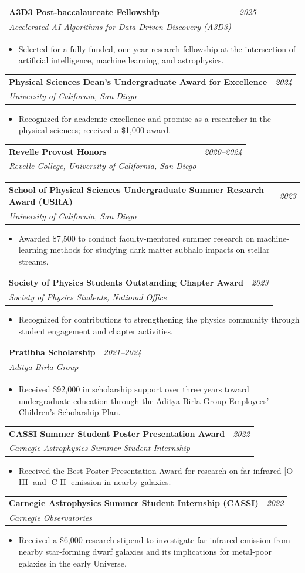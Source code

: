 \documentclass[a4paper,11pt]{article}
\makeatletter
\newcommand{\resumeProject}[4]{
\vspace{0.5mm}\item
    \begin{tabular*}{0.98\textwidth}[t]{l@{\extracolsep{\fill}}r}
        \textbf{#1} & \textit{\footnotesize{#3}} \\
        \footnotesize{\textit{#2}} & \footnotesize{#4}
    \end{tabular*}
    \vspace{-2.4mm}
}
\newcommand{\resumeItemListStart}{\begin{itemize}[leftmargin=*,labelsep=1mm,itemsep=0.5mm]}
\newcommand{\resumeItemListEnd}{\end{itemize}\vspace{-2mm}}
\makeatother
\begin{document}
\resumeProject
  {A3D3 Post-baccalaureate Fellowship}
  {Accelerated AI Algorithms for Data-Driven Discovery (A3D3)}
  {2025}
  {}
\resumeItemListStart
  \item Selected for a fully funded, one-year research fellowship at the intersection of artificial intelligence, machine learning, and astrophysics.
\resumeItemListEnd

\resumeProject
  {Physical Sciences Dean's Undergraduate Award for Excellence}
  {University of California, San Diego}
  {2024}
  {}
\resumeItemListStart
  \item Recognized for academic excellence and promise as a researcher in the physical sciences; received a \$1,000 award.
\resumeItemListEnd

\resumeProject
  {Revelle Provost Honors}
  {Revelle College, University of California, San Diego}
  {2020--2024}
  {}

\resumeProject
  {School of Physical Sciences Undergraduate Summer Research Award (USRA)}
  {University of California, San Diego}
  {2023}
  {}
\resumeItemListStart
  \item Awarded \$7,500 to conduct faculty-mentored summer research on machine-learning methods for studying dark matter subhalo impacts on stellar streams.
\resumeItemListEnd

\resumeProject
  {Society of Physics Students Outstanding Chapter Award}
  {Society of Physics Students, National Office}
  {2023}
  {}
\resumeItemListStart
  \item Recognized for contributions to strengthening the physics community through student engagement and chapter activities.
\resumeItemListEnd

\resumeProject
  {Pratibha Scholarship}
  {Aditya Birla Group}
  {2021--2024}
  {}
\resumeItemListStart
  \item Received \$92,000 in scholarship support over three years toward undergraduate education through the Aditya Birla Group Employees' Children’s Scholarship Plan.
\resumeItemListEnd

\resumeProject
  {CASSI Summer Student Poster Presentation Award}
  {Carnegie Astrophysics Summer Student Internship}
  {2022}
  {}
\resumeItemListStart
  \item Received the Best Poster Presentation Award for research on far-infrared [O III] and [C II] emission in nearby galaxies.
\resumeItemListEnd

\resumeProject
  {Carnegie Astrophysics Summer Student Internship (CASSI)}
  {Carnegie Observatories}
  {2022}
  {}
\resumeItemListStart
  \item Received a \$6,000 research stipend to investigate far-infrared emission from nearby star-forming dwarf galaxies and its implications for metal-poor galaxies in the early Universe.
\resumeItemListEnd
\end{document}
